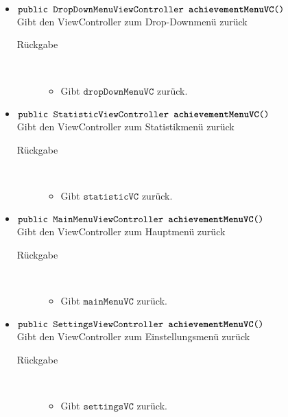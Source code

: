\begin{description}
\begin{itemize}
		\item $\texttt{public DropDownMenuViewController \textbf{achievementMenuVC}()}$ \\ Gibt den ViewController zum Drop-Downmenü zurück
		\begin{description}
			\item[Rückgabe] \hfill \\
			\vspace{-.8cm}
			\begin{itemize}
				\item Gibt $\texttt{dropDownMenuVC}$ zurück.
			\end{itemize}
			\end{description}
			
		\item $\texttt{public StatisticViewController \textbf{achievementMenuVC}()}$ \\ Gibt den ViewController zum Statistikmenü zurück
			\begin{description}
			\item[Rückgabe] \hfill \\
			\vspace{-.8cm}
			\begin{itemize}
				\item Gibt $\texttt{statisticVC}$ zurück.
			\end{itemize}
			\end{description}
			
		\item $\texttt{public MainMenuViewController \textbf{achievementMenuVC}()}$ \\ Gibt den ViewController zum Hauptmenü zurück
		\begin{description}
			\item[Rückgabe] \hfill \\
			\vspace{-.8cm}
			\begin{itemize}
				\item Gibt $\texttt{mainMenuVC}$ zurück.
			\end{itemize}
			\end{description}
			
		\item $\texttt{public SettingsViewController \textbf{achievementMenuVC}()}$ \\ Gibt den ViewController zum Einstellungsmenü zurück
		\begin{description}
			\item[Rückgabe] \hfill \\
			\vspace{-.8cm}
			\begin{itemize}
				\item Gibt $\texttt{settingsVC}$ zurück.
			\end{itemize}
			\end{description}
			

\end{itemize}
\end{description}
